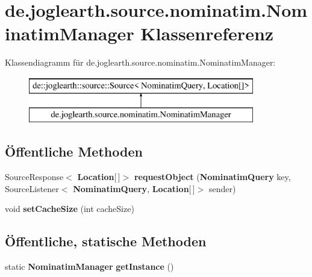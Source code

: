 \section{de.\-joglearth.\-source.\-nominatim.\-Nominatim\-Manager Klassenreferenz}
\label{classde_1_1joglearth_1_1source_1_1nominatim_1_1_nominatim_manager}
Klassendiagramm für de.\-joglearth.\-source.\-nominatim.\-Nominatim\-Manager\-:\begin{figure}[H]
\begin{center}
\leavevmode
\includegraphics[height=2.000000cm]{classde_1_1joglearth_1_1source_1_1nominatim_1_1_nominatim_manager}
\end{center}
\end{figure}
\subsection*{Öffentliche Methoden}
\begin{DoxyCompactItemize}
\item 
Source\-Response$<$ {\bf Location}[$\,$]$>$ {\bfseries request\-Object} ({\bf Nominatim\-Query} key, Source\-Listener$<$ {\bf Nominatim\-Query}, {\bf Location}[$\,$]$>$ sender)\label{classde_1_1joglearth_1_1source_1_1nominatim_1_1_nominatim_manager_aed4ffa20f411b64191a5009fec8b0646}

\item 
void {\bfseries set\-Cache\-Size} (int cache\-Size)\label{classde_1_1joglearth_1_1source_1_1nominatim_1_1_nominatim_manager_ae2a43b7a49f6d0cf9040380396f91169}

\end{DoxyCompactItemize}
\subsection*{Öffentliche, statische Methoden}
\begin{DoxyCompactItemize}
\item 
static {\bf Nominatim\-Manager} {\bfseries get\-Instance} ()\label{classde_1_1joglearth_1_1source_1_1nominatim_1_1_nominatim_manager_aaa7bdec62233b4724949821bd1f4add8}

\end{DoxyCompactItemize}
